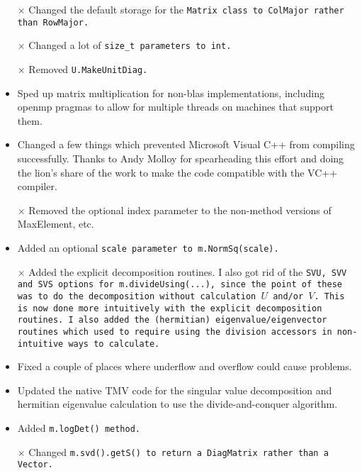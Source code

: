 \begin{description}
\begin{itemize}

\item[$\times$]
Changed the default storage for the \tt{Matrix} class to \tt{ColMajor}
rather than \tt{RowMajor}.

\item[$\times$]
Changed a lot of \tt{size\_t} parameters to \tt{int}.

\item[$\times$]
Removed \tt{U.MakeUnitDiag}.

\item
Sped up matrix multiplication for non-blas implementations, including
openmp pragmas to allow for multiple threads on machines that support them.

\item
Changed a few things which prevented Microsoft Visual C++ from compiling successfully.  
Thanks to Andy Molloy
for spearheading this effort and doing the lion's share of the work to make
the code compatible with the VC++ compiler.

\item[$\times$]
Removed the optional index parameter to the non-method versions of 
MaxElement, etc.  

\item
Added an optional \tt{scale} parameter to \tt{m.NormSq(scale)}.

\item[$\times$]
Added the explicit decomposition routines.  I also
got rid of the \tt{SVU}, \tt{SVV} and \tt{SVS} options for \tt{m.divideUsing(...)}, since the point 
of these was to do the decomposition without calculation $U$ and/or $V$.  This is now done
more intuitively with the explicit decomposition routines.
I also added the (hermitian) eigenvalue/eigenvector routines which used to
require using the division accessors in non-intuitive ways to calculate.

\item 
Fixed a couple of places where underflow and overflow could cause problems.  

\item
Updated the native TMV code for the singular value decomposition and hermitian 
eigenvalue calculation to use the divide-and-conquer algorithm.

\item
Added \tt{m.logDet()} method.  

\item[$\times$]
Changed \tt{m.svd().getS()} to return a \tt{DiagMatrix} rather than a \tt{Vector}.


\end{itemize}
\end{description}
